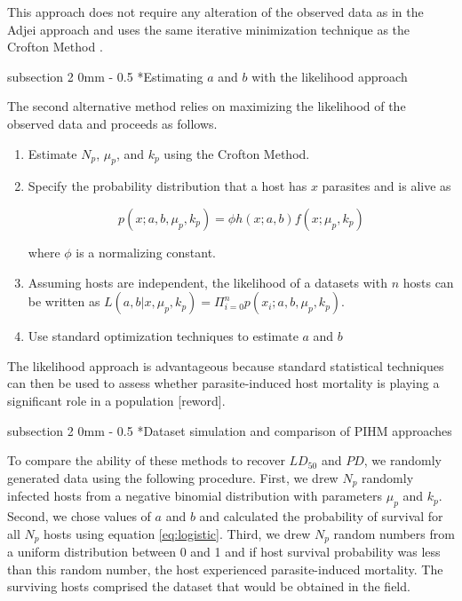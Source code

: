 \documentclass[12pt, a4paper]{article}
\makeatletter
\renewcommand{\subsection}{\@startsection
{subsection}%
{2}%
{0mm}%
{-\baselineskip}%
{0.5\baselineskip}%
{\normalfont\bf}} %
\makeatother
\begin{document}
\doublespacing

This approach does not require any alteration of the observed data as in the Adjei approach and uses the same iterative minimization technique as the Crofton Method \citep{Lester1977}.

\subsection*{Estimating $a$ and $b$ with the likelihood approach}

The second alternative method relies on maximizing the likelihood of the observed data and proceeds as follows.

\singlespacing
\begin{enumerate}
    \item Estimate $N_p$, $\mu_p$, and $k_p$ using the Crofton Method.
    \item Specify the probability distribution that a host has $x$ parasites and is alive as

    \begin{equation}
        p(x; a, b, \mu_p, k_p) = \phi h(x; a, b) f(x; \mu_p, k_p)
    \end{equation}

    where $\phi$ is a normalizing constant. %

    \item Assuming hosts are independent, the likelihood of a datasets with $n$ hosts can be written as $L(a, b | x, \mu_p, k_p) = \Pi_{i=0}^n p(x_i ; a, b, \mu_p, k_p)$.

    \item Use standard optimization techniques to estimate $a$ and $b$

\end{enumerate}

\doublespacing
The likelihood approach is advantageous because standard statistical techniques can then be used to assess whether parasite-induced host mortality is playing a significant role in a population [reword].

\subsection*{Dataset simulation and comparison of PIHM approaches}

To compare the ability of these methods to recover $LD_{50}$ and $PD$, we randomly generated data using the
following procedure.  First, we drew $N_p$ randomly infected hosts from a
negative binomial distribution with parameters $\mu_p$ and $k_p$.  Second, we chose values of $a$ and $b$ and calculated the probability of survival
for all $N_p$ hosts using equation \ref{eq:logistic}.  Third, we drew $N_p$ random numbers from a uniform distribution
between 0 and 1 and if host survival probability was less than this random
number, the host experienced parasite-induced mortality.  The surviving
hosts comprised the dataset that would be obtained in the field.
\end{document}
